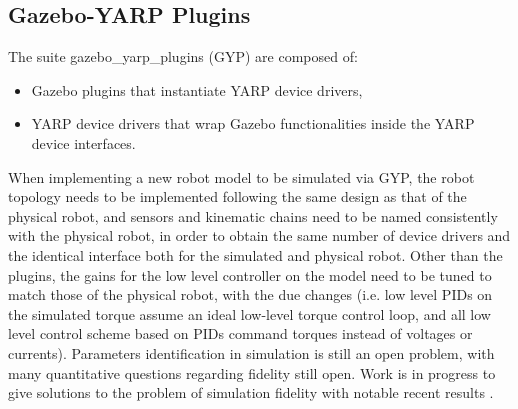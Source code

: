 \subsection{Gazebo-YARP Plugins}
The suite gazebo\_yarp\_plugins (GYP) are composed of:
\begin{itemize}
    \item Gazebo plugins that instantiate YARP device drivers,
    \item YARP device drivers that wrap Gazebo functionalities inside the YARP device interfaces.
\end{itemize}
When implementing a new robot model to be simulated via GYP, the robot topology needs to be implemented following the same design as that of the physical robot, and sensors and kinematic chains need to be named consistently with the physical robot, in order to obtain the same number of device drivers and the identical interface both for the simulated and physical robot. Other than the plugins, the gains for the low level controller on the model need to be tuned to match those of the physical robot, with the due changes (i.e. low level PIDs on the simulated torque assume an ideal low-level torque control loop, and all low level control scheme based on PIDs command torques instead of voltages or currents).
Parameters identification in simulation is still an open problem, with many quantitative questions regarding fidelity still open. Work is in progress to give solutions to the problem of simulation fidelity with notable recent results  \cite{hauser13blem, uchida15}.

